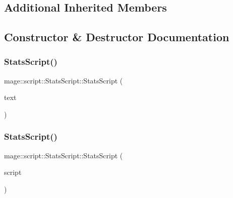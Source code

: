 \subsection*{Additional Inherited Members}


\subsection{Constructor \& Destructor Documentation}
\hypertarget{classmage_1_1script_1_1_stats_script_ad03d10952f46b88d2b3a55acbff11240}{}\label{classmage_1_1script_1_1_stats_script_ad03d10952f46b88d2b3a55acbff11240} 
\subsubsection{\texorpdfstring{Stats\+Script()}{StatsScript()}\hspace{0.1cm}{\footnotesize\ttfamily [1/3]}}
{\footnotesize\ttfamily mage\+::script\+::\+Stats\+Script\+::\+Stats\+Script (\begin{DoxyParamCaption}\item[{\hyperlink{classmage_1_1_sprite_text}{Sprite\+Text} $\ast$}]{text }\end{DoxyParamCaption})\hspace{0.3cm}{\ttfamily [explicit]}}

\hypertarget{classmage_1_1script_1_1_stats_script_aae7cec6358e2e3ebd36f922f106627d8}{}\label{classmage_1_1script_1_1_stats_script_aae7cec6358e2e3ebd36f922f106627d8} 
\subsubsection{\texorpdfstring{Stats\+Script()}{StatsScript()}\hspace{0.1cm}{\footnotesize\ttfamily [2/3]}}
{\footnotesize\ttfamily mage\+::script\+::\+Stats\+Script\+::\+Stats\+Script (\begin{DoxyParamCaption}\item[{const \hyperlink{classmage_1_1script_1_1_stats_script}{Stats\+Script} \&}]{script }\end{DoxyParamCaption})\hspace{0.3cm}{\ttfamily [delete]}}

